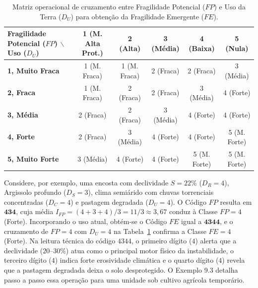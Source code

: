 \begin{table}[H]
\centering
\caption{Matriz operacional de cruzamento entre Fragilidade Potencial ($FP$) e Uso da Terra ($D_U$) para obtenção da Fragilidade Emergente ($FE$).}
\label{tab:matriz_ross_fe}
\renewcommand{\arraystretch}{1.15}
\footnotesize
\begin{tabular}{@{}l|ccccc@{}}
  \toprule
  \textbf{Fragilidade Potencial ($FP$)} $\backslash$ \textbf{Uso ($D_U$)} & \textbf{1 (M. Alta Prot.)} & \textbf{2 (Alta)} & \textbf{3 (Média)} & \textbf{4 (Baixa)} & \textbf{5 (Nula)} \\
  \midrule
  \textbf{1, Muito Fraca} & 1 (M. Fraca) & 1 (M. Fraca) & 2 (Fraca) & 2 (Fraca) & 3 (Média) \\
  \textbf{2, Fraca} & 1 (M. Fraca) & 2 (Fraca) & 2 (Fraca) & 3 (Média) & 4 (Forte) \\
  \textbf{3, Média} & 2 (Fraca) & 2 (Fraca) & 3 (Média) & 4 (Forte) & 4 (Forte) \\
  \textbf{4, Forte} & 2 (Fraca) & 3 (Média) & 4 (Forte) & 4 (Forte) & 5 (M. Forte) \\
  \textbf{5, Muito Forte} & 3 (Média) & 4 (Forte) & 4 (Forte) & 5 (M. Forte) & 5 (M. Forte) \\
  \bottomrule
\end{tabular}
\end{table}

Considere, por exemplo, uma encosta com declividade $S = 22\%$ ($D_R = 4$), Argissolo profundo ($D_S = 3$), clima semiárido com chuvas torrenciais concentradas ($D_C = 4$) e pastagem degradada ($D_U = 4$). O Código $FP$ resulta em $\mathbf{434}$, cuja média $I_{FP} = (4 + 3 + 4)/3 = 11/3 \approx 3{,}67$ conduz à Classe $FP = 4$ (Forte). Incorporando o uso atual, obtém-se o Código $FE$ igual a $\mathbf{4344}$, e o cruzamento de $FP = 4$ com $D_U = 4$ na Tabela~\ref{tab:matriz_ross_fe} confirma a Classe $FE = 4$ (Forte). Na leitura técnica do código $4344$, o primeiro dígito ($4$) alerta que a declividade ($20\text{--}30\%$) atua como o principal motor físico da instabilidade, o terceiro dígito ($4$) indica forte erosividade climática e o quarto dígito ($4$) revela que a pastagem degradada deixa o solo desprotegido. O Exemplo 9.3 detalha passo a passo essa operação para uma unidade sob cultivo agrícola temporário.

